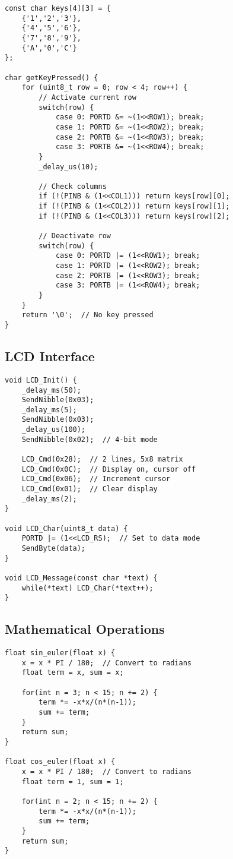 \documentclass{article}
\begin{document}
\begin{lstlisting}[caption=Keypad Scanning Function, label=lst:keypad]
const char keys[4][3] = {
    {'1','2','3'},
    {'4','5','6'},
    {'7','8','9'},
    {'A','0','C'}
};

char getKeyPressed() {
    for (uint8_t row = 0; row < 4; row++) {
        // Activate current row
        switch(row) {
            case 0: PORTD &= ~(1<<ROW1); break;
            case 1: PORTD &= ~(1<<ROW2); break;
            case 2: PORTB &= ~(1<<ROW3); break;
            case 3: PORTB &= ~(1<<ROW4); break;
        }
        _delay_us(10);
        
        // Check columns
        if (!(PINB & (1<<COL1))) return keys[row][0];
        if (!(PINB & (1<<COL2))) return keys[row][1];
        if (!(PINB & (1<<COL3))) return keys[row][2];
        
        // Deactivate row
        switch(row) {
            case 0: PORTD |= (1<<ROW1); break;
            case 1: PORTD |= (1<<ROW2); break;
            case 2: PORTB |= (1<<ROW3); break;
            case 3: PORTB |= (1<<ROW4); break;
        }
    }
    return '\0';  // No key pressed
}
\end{lstlisting}

\subsection{LCD Interface}

\begin{lstlisting}[caption=LCD Initialization, label=lst:lcd]
void LCD_Init() {
    _delay_ms(50);
    SendNibble(0x03);
    _delay_ms(5);
    SendNibble(0x03);
    _delay_us(100);
    SendNibble(0x02);  // 4-bit mode
    
    LCD_Cmd(0x28);  // 2 lines, 5x8 matrix
    LCD_Cmd(0x0C);  // Display on, cursor off
    LCD_Cmd(0x06);  // Increment cursor
    LCD_Cmd(0x01);  // Clear display
    _delay_ms(2);
}

void LCD_Char(uint8_t data) {
    PORTD |= (1<<LCD_RS);  // Set to data mode
    SendByte(data);
}

void LCD_Message(const char *text) {
    while(*text) LCD_Char(*text++);
}
\end{lstlisting}

\subsection{Mathematical Operations}

\begin{lstlisting}[caption=Trigonometric Functions, label=lst:trig]
float sin_euler(float x) {
    x = x * PI / 180;  // Convert to radians
    float term = x, sum = x;
    
    for(int n = 3; n < 15; n += 2) {
        term *= -x*x/(n*(n-1));
        sum += term;
    }
    return sum;
}

float cos_euler(float x) {
    x = x * PI / 180;  // Convert to radians
    float term = 1, sum = 1;
    
    for(int n = 2; n < 15; n += 2) {
        term *= -x*x/(n*(n-1));
        sum += term;
    }
    return sum;
}
\end{lstlisting}
\end{document}
